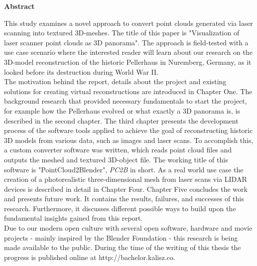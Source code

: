 \thispagestyle{plain}
\begin{center}
	
	\LARGE
	\textbf{Abstract}
	
\end{center}
\vspace{100pt}

This study examines a novel approach to convert point clouds generated via laser scanning into textured 3D-meshes. The title of this paper is "Visualization of laser scanner point clouds as 3D panorama".
The approach is field-tested with a use case scenario where the interested reader will learn about our research on the 3D-model reconstruction of the historic Pellerhaus in Nuremberg, Germany, as it looked before its destruction during World War II.\\

The motivation behind the report, details about the project and existing solutions for creating virtual reconstructions are introduced in Chapter One.
The background research that provided necessary fundamentals to start the project, for example how the Pellerhaus evolved or what exactly a 3D panorama is, is described in the second chapter.
The third chapter presents the development process of the software tools applied to achieve the goal of reconstructing historic 3D models from various data, such as images and laser scans. To accomplish this, a custom converter software was written, which reads point cloud files and outputs the meshed and textured 3D-object file. The working title of this software is "PointCloud2Blender", \textit{PC2B} in short.
As a real world use case the creation of a photorealistic three-dimensional mesh from laser scans via LIDAR devices is described in detail in Chapter Four.
Chapter Five concludes the work and presents future work. It contains the results, failures, and successes of this research. Furthermore, it discusses different possible ways to build upon the fundamental insights gained from this report.\\

Due to our modern open culture with several open software, hardware and movie projects - mainly inspired by the Blender Foundation - this research is being made available to the public. During the time of the writing of this thesis the progress is published online at http://bachelor.kalisz.co.

